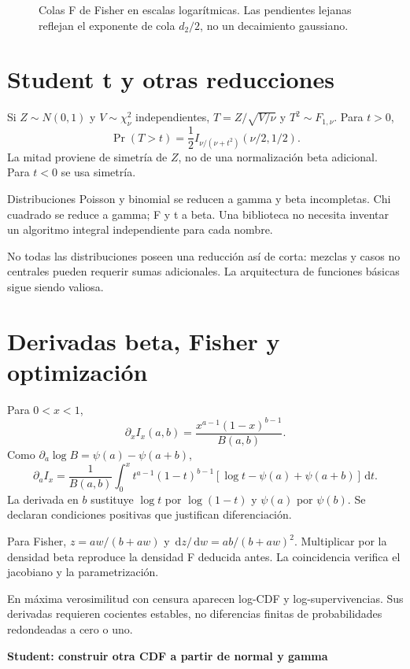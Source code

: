 \documentclass[11pt,a4paper]{article}
\newcommand{\dd}{\,\mathrm d}
\theoremstyle{definition}
\newcommand{\parte}[1]{\par\bigskip\Needspace{8\baselineskip}\begin{center}{\Large\bfseries\color{azul}#1}\end{center}}
\begin{document}
\begin{figure}[htbp]
\caption{Colas F de Fisher en escalas logarítmicas. Las pendientes lejanas reflejan el exponente de cola $d_2/2$, no un decaimiento gaussiano.}\label{fig:cdf-20}\end{figure}

\section{Student t y otras reducciones}
Si $Z\sim N(0,1)$ y $V\sim\chi^2_\nu$ independientes,
$T=Z/\sqrt{V/\nu}$ y $T^2\sim F_{1,\nu}$. Para $t>0$,
\[
\Pr(T>t)=\frac12I_{\nu/(\nu+t^2)}(\nu/2,1/2).
\]
La mitad proviene de simetría de $Z$, no de una normalización beta adicional. Para $t<0$ se usa simetría.

Distribuciones Poisson y binomial se reducen a gamma y beta incompletas. Chi cuadrado se reduce a gamma; F y t a beta. Una biblioteca no necesita inventar un algoritmo integral independiente para cada nombre.

No todas las distribuciones poseen una reducción así de corta: mezclas y casos no centrales pueden requerir sumas adicionales. La arquitectura de funciones básicas sigue siendo valiosa.

\section{Derivadas beta, Fisher y optimización}
Para $0<x<1$,
\[
\partial_xI_x(a,b)=\frac{x^{a-1}(1-x)^{b-1}}{B(a,b)}.
\]
Como $\partial_a\log B=\psi(a)-\psi(a+b)$,
\[
\partial_a I_x=
\frac1{B(a,b)}\int_0^x t^{a-1}(1-t)^{b-1}
[\log t-\psi(a)+\psi(a+b)]\dd t.
\]
La derivada en $b$ sustituye $\log t$ por $\log(1-t)$ y $\psi(a)$ por $\psi(b)$. Se declaran condiciones positivas que justifican diferenciación.

Para Fisher, $z=aw/(b+aw)$ y
$\dd z/\dd w=ab/(b+aw)^2$. Multiplicar por la densidad beta reproduce la densidad F deducida antes. La coincidencia verifica el jacobiano y la parametrización.

En máxima verosimilitud con censura aparecen log-CDF y log-supervivencias. Sus derivadas requieren cocientes estables, no diferencias finitas de probabilidades redondeadas a cero o uno.



\parte{Student: construir otra CDF a partir de normal y gamma}
\end{document}
